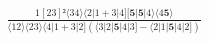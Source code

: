 \documentclass[varwidth, border=5pt]{standalone}
\begin{document}
\begin{my}
$\begin{gathered}
\scriptscriptstyle\frac{1[23]²⟨34⟩⟨2|1+3|4][𝟓|𝟓|4⟩⟨4𝟓⟩}{⟨12⟩⟨23⟩⟨4|1+3|2](⟨3|2|𝟓|4|3]-⟨2|1|𝟓|4|2])}
\end{gathered}$
\end{my}
\end{document}
